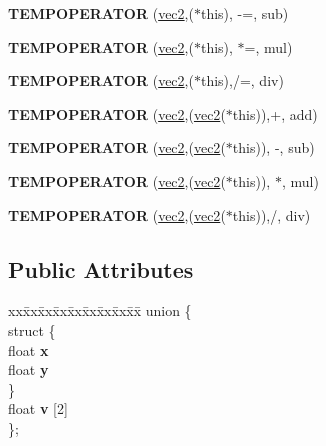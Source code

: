 \begin{DoxyCompactItemize}
\item 
\mbox{\label{structvec2_a3dda00fcd17a6ebfac2b9b1e420caf35}} 
{\bfseries T\+E\+M\+P\+O\+P\+E\+R\+A\+T\+OR} (\hyperlink{structvec2}{vec2},($\ast$this), -\/=, sub)
\item 
\mbox{\label{structvec2_a919ca217b0991b1641490d8f82111133}} 
{\bfseries T\+E\+M\+P\+O\+P\+E\+R\+A\+T\+OR} (\hyperlink{structvec2}{vec2},($\ast$this), $\ast$=, mul)
\item 
\mbox{\label{structvec2_a69b796ca68b7c2bc8fc4c3b0dc42b401}} 
{\bfseries T\+E\+M\+P\+O\+P\+E\+R\+A\+T\+OR} (\hyperlink{structvec2}{vec2},($\ast$this),/=, div)
\item 
\mbox{\label{structvec2_a11389c40c8d75e6bcab456c0c035653f}} 
{\bfseries T\+E\+M\+P\+O\+P\+E\+R\+A\+T\+OR} (\hyperlink{structvec2}{vec2},(\hyperlink{structvec2}{vec2}($\ast$this)),+, add)
\item 
\mbox{\label{structvec2_a20dd16737926bff2dc4d0f100d34d867}} 
{\bfseries T\+E\+M\+P\+O\+P\+E\+R\+A\+T\+OR} (\hyperlink{structvec2}{vec2},(\hyperlink{structvec2}{vec2}($\ast$this)), -\/, sub)
\item 
\mbox{\label{structvec2_a63ed2f7cb59683ca1b04467917ee8dce}} 
{\bfseries T\+E\+M\+P\+O\+P\+E\+R\+A\+T\+OR} (\hyperlink{structvec2}{vec2},(\hyperlink{structvec2}{vec2}($\ast$this)), $\ast$, mul)
\item 
\mbox{\label{structvec2_a01ff2ea7192d1a0ed8a06684502ccb97}} 
{\bfseries T\+E\+M\+P\+O\+P\+E\+R\+A\+T\+OR} (\hyperlink{structvec2}{vec2},(\hyperlink{structvec2}{vec2}($\ast$this)),/, div)
\end{DoxyCompactItemize}
\subsection*{Public Attributes}
\begin{DoxyCompactItemize}
\item 
\mbox{\label{structvec2_a936a48bfa5a35a7e611c0b4ae9411a1d}} 
\begin{tabbing}
xx\=xx\=xx\=xx\=xx\=xx\=xx\=xx\=xx\=\kill
union \{\\
\mbox{\label{unionvec2_1_1_0D169_a1f55c3ee84b5b2e0abd934fc3b23a5c6}} 
\>struct \{\\
\>\>float {\bfseries x}\\
\>\>float {\bfseries y}\\
\>\} \\
\>float {\bfseries v} \mbox{[}2\mbox{]}\\
\}; \\

\end{tabbing}\end{DoxyCompactItemize}


